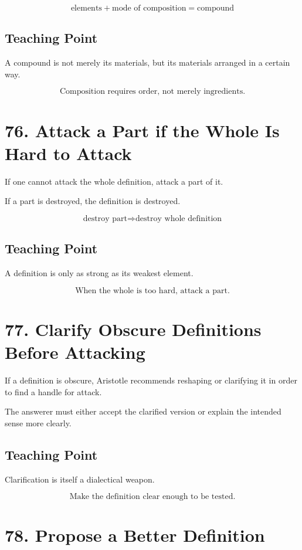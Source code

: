 \documentclass[12pt]{article}
\begin{document}
\[
\text{elements} + \text{mode of composition} = \text{compound}
\]

\subsection*{Teaching Point}

A compound is not merely its materials, but its materials arranged in a certain
way.

\[
\boxed{
\text{Composition requires order, not merely ingredients.}
}
\]

\section*{76. Attack a Part if the Whole Is Hard to Attack}

If one cannot attack the whole definition, attack a part of it.

If a part is destroyed, the definition is destroyed.

\[
\text{destroy part} \Rightarrow \text{destroy whole definition}
\]

\subsection*{Teaching Point}

A definition is only as strong as its weakest element.

\[
\boxed{
\text{When the whole is too hard, attack a part.}
}
\]

\section*{77. Clarify Obscure Definitions Before Attacking}

If a definition is obscure, Aristotle recommends reshaping or clarifying it in
order to find a handle for attack.

The answerer must either accept the clarified version or explain the intended
sense more clearly.

\subsection*{Teaching Point}

Clarification is itself a dialectical weapon.

\[
\boxed{
\text{Make the definition clear enough to be tested.}
}
\]

\section*{78. Propose a Better Definition}
\end{document}
